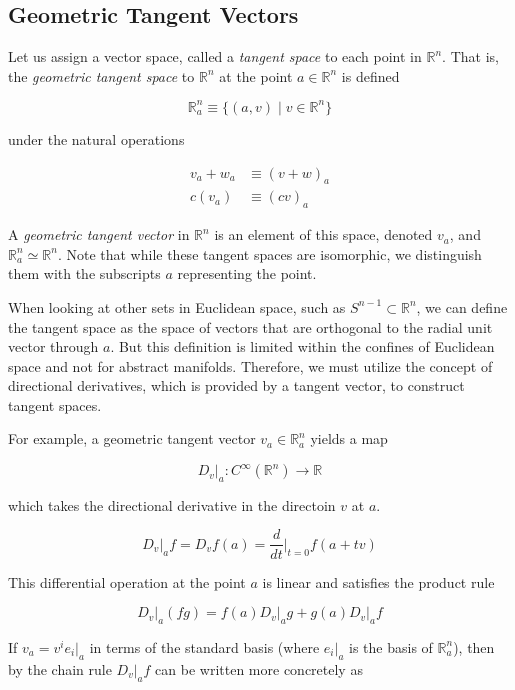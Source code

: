 \documentclass{article}
\theoremstyle{remark}
\theoremstyle{definition}
\begin{document}
  \subsection{Geometric Tangent Vectors}

    Let us assign a vector space, called a \textit{tangent space} to each point in $\mathbb{R}^n$. That is, the \textit{geometric tangent space} to $\mathbb{R}^n$ at the point $a \in \mathbb{R}^n$ is defined

      \[\mathbb{R}_a^n \equiv \{(a, v) \;|\; v \in \mathbb{R}^n \}\]

    under the natural operations

    \begin{align*}
      v_a + w_a & \equiv (v + w)_a \\
      c (v_a) & \equiv (c v)_a
    \end{align*}

    A \textit{geometric tangent vector} in $\mathbb{R}^n$ is an element of this space, denoted $v_a$, and $\mathbb{R}^n_a \simeq \mathbb{R}^n$. Note that while these tangent spaces are isomorphic, we distinguish them with the subscripts $a$ representing the point. 

    When looking at other sets in Euclidean space, such as $S^{n-1} \subset \mathbb{R}^n$, we can define the tangent space as the space of vectors that are orthogonal to the radial unit vector through $a$. But this definition is limited within the confines of Euclidean space and not for abstract manifolds. Therefore, we must utilize the concept of directional derivatives, which is provided by a tangent vector, to construct tangent spaces. 

    For example, a geometric tangent vector $v_a \in \mathbb{R}^n_a$ yields a map

      \[D_v \big|_a: C^\infty (\mathbb{R}^n) \longrightarrow \mathbb{R}\]

    which takes the directional derivative in the directoin $v$ at $a$.

      \[D_v \big|_a f = D_v f(a) = \frac{d}{dt} \bigg|_{t=0} f(a + t v)\]

    This differential operation at the point $a$ is linear and satisfies the product rule

      \[D_v \big|_a (f g) = f(a) D_v \big|_a g +g(a) D_v \big|_a f\]

    If $v_a = v^i e_i |_a$ in terms of the standard basis (where $e_i |_a$ is the basis of $\mathbb{R}^n_a$), then by the chain rule $D_v |_a f$ can be written more concretely as
\end{document}
